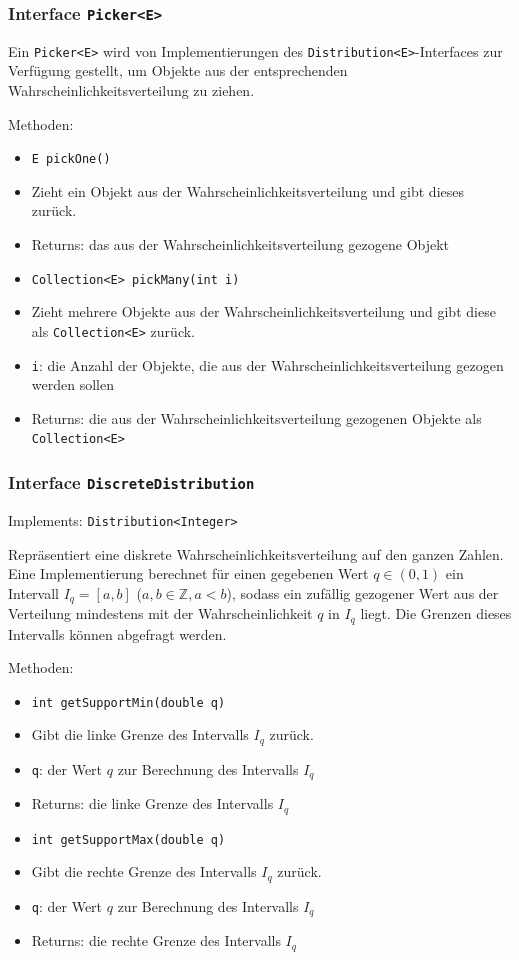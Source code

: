 \documentclass[parskip=full,11pt]{scrartcl}
\begin{document}
\subsubsection{Interface \texttt{Picker<E>}}
Ein \texttt{Picker<E>} wird von Implementierungen des \texttt{Distribution<E>}-Interfaces zur Verfügung gestellt, um Objekte aus der entsprechenden Wahrscheinlichkeitsverteilung zu ziehen.

Methoden:
\begin{itemize}\itemsep -10pt
\item \texttt{E pickOne()}
\item[] Zieht ein Objekt aus der Wahrscheinlichkeitsverteilung und gibt dieses zurück.
\item[] Returns: das aus der Wahrscheinlichkeitsverteilung gezogene Objekt

\item \texttt{Collection<E> pickMany(int i)}
\item[] Zieht mehrere Objekte aus der Wahrscheinlichkeitsverteilung und gibt diese als \texttt{Collection<E>} zurück.
\item[] \texttt{i}: die Anzahl der Objekte, die aus der Wahrscheinlichkeitsverteilung gezogen werden sollen
\item[] Returns: die aus der Wahrscheinlichkeitsverteilung gezogenen Objekte als \texttt{Collection<E>}
\end{itemize}

\subsubsection{Interface \texttt{DiscreteDistribution}}
Implements: \texttt{Distribution<Integer>}

Repräsentiert eine diskrete Wahrscheinlichkeitsverteilung auf den ganzen Zahlen. Eine Implementierung berechnet für einen gegebenen Wert \(q \in (0,1)\) ein Intervall \(I_q = [a,b]\) (\(a,b \in \mathbb{Z}, a < b\)), sodass ein zufällig gezogener Wert aus der Verteilung mindestens mit der Wahrscheinlichkeit \(q\) in \(I_q\) liegt. Die Grenzen dieses Intervalls können abgefragt werden.

Methoden:
\begin{itemize}\itemsep -10pt
\item \texttt{int getSupportMin(double q)}
\item[] Gibt die linke Grenze des Intervalls \(I_q\) zurück.
\item[] \texttt{q}: der Wert \(q\) zur Berechnung des Intervalls \(I_q\)
\item[] Returns: die linke Grenze des Intervalls \(I_q\)

\item \texttt{int getSupportMax(double q)}
\item[] Gibt die rechte Grenze des Intervalls \(I_q\) zurück.
\item[] \texttt{q}: der Wert \(q\) zur Berechnung des Intervalls \(I_q\)
\item[] Returns: die rechte Grenze des Intervalls \(I_q\)
\end{itemize}
\end{document}
